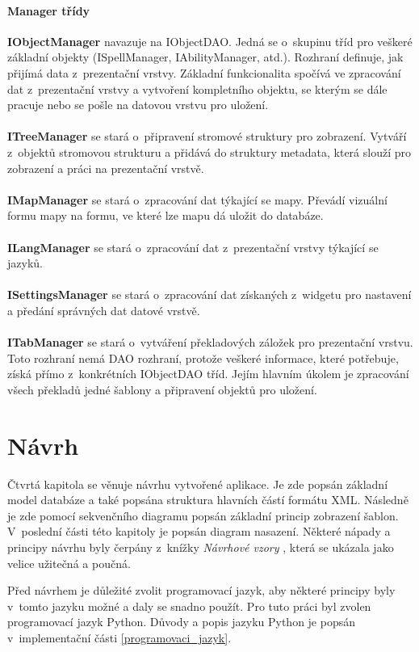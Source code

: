 \documentclass[thesis=B,czech]{resources/FITthesis}[2012/06/26]
\begin{document}
\subsubsection*{Manager třídy}
\textbf{IObjectManager} navazuje na IObjectDAO. Jedná se o~skupinu tříd pro veškeré základní objekty (ISpellManager, IAbilityManager, atd.). Rozhraní definuje, jak přijímá data z~prezentační vrstvy. Základní funkcionalita spočívá ve zpracování dat z~prezentační vrstvy a vytvoření kompletního objektu, se kterým se dále pracuje nebo se pošle na datovou vrstvu pro uložení.\\
\\
\noindent\textbf{ITreeManager} se stará o~připravení stromové struktury pro zobrazení. Vytváří z~objektů stromovou strukturu a přidává do struktury metadata, která slouží pro zobrazení a práci na prezentační vrstvě.\\
\\
\textbf{IMapManager} se stará o~zpracování dat týkající se mapy. Převádí vizuální formu mapy na formu, ve které lze mapu dá uložit do databáze. \\
\\
\textbf{ILangManager} se stará o~zpracování dat z~prezentační vrstvy týkající se jazyků.\\
\\
\textbf{ISettingsManager} se stará o~zpracování dat získaných z~widgetu pro nastavení a předání správných dat datové vrstvě.\\
\\
\textbf{ITabManager} se stará o~vytváření překladových záložek pro prezentační vrstvu. Toto rozhraní nemá DAO rozhraní, protože veškeré informace, které potřebuje, získá přímo z~konkrétních IObjectDAO tříd. Jejím hlavním úkolem je zpracování všech překladů jedné šablony a připravení objektů pro uložení.\\





\chapter{Návrh}
Čtvrtá kapitola se věnuje návrhu vytvořené aplikace. Je zde popsán základní model databáze a také popsána struktura hlavních částí formátu XML. Následně je zde pomocí sekvenčního diagramu popsán základní princip zobrazení šablon. V~poslední části této kapitoly je popsán diagram nasazení. Některé nápady a principy návrhu byly čerpány z~knížky \textit{Návrhové vzory} \cite{navrhove_vzory}, která se ukázala jako velice užitečná a poučná. \par
Před návrhem je důležité zvolit programovací jazyk, aby některé principy byly v~tomto jazyku možné a daly se snadno použít. Pro tuto práci byl zvolen programovací jazyk Python. Důvody a popis jazyku Python je popsán v~implementační části \ref{programovaci_jazyk}. 
\end{document}

